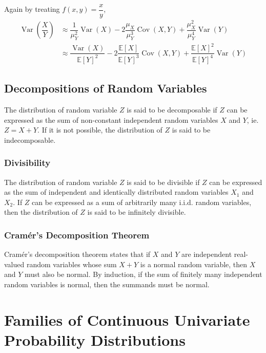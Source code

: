 \documentclass[11pt]{report} %
\begin{document}
Again by treating $f\left(x, y\right) = \dfrac{x}{y}$, 
\begin{align}
\operatorname{Var}\left(\dfrac{X}{Y}\right) &\approx \dfrac{1}{\mu_{Y}^{2}}\operatorname{Var}\left(X\right) - 2\dfrac{\mu_{X}}{\mu_{Y}^{3}}\operatorname{Cov}\left(X, Y\right) + \dfrac{\mu_{X}^{2}}{\mu_{Y}^{4}}\operatorname{Var}\left(Y\right) \\
&\approx \dfrac{\operatorname{Var}\left(X\right)}{\mathbb{E}\left[Y\right]^{2}} - 2\dfrac{\mathbb{E}\left[X\right]}{\mathbb{E}\left[Y\right]^{3}}\operatorname{Cov}\left(X, Y\right) + \dfrac{\mathbb{E}\left[X\right]^{2}}{\mathbb{E}\left[Y\right]^{4}}\operatorname{Var}\left(Y\right)
\end{align}

\subsection{Decompositions of Random Variables}

The distribution of random variable $Z$ is said to be decomposable if $Z$ can be expressed as the sum of non-constant independent random variables $X$ and $Y$, ie. $Z = X + Y$. If it is not possible, the distribution of $Z$ is said to be indecomposable.

\subsubsection{Divisibility}

The distribution of random variable $Z$ is said to be divisible if $Z$ can be expressed as the sum of independent and identically distributed random variables $X_{1}$ and $X_{2}$. If $Z$ can be expressed as a sum of arbitrarily many i.i.d. random variables, then the distribution of $Z$ is said to be infinitely divisible.

\subsubsection{Cram\'{e}r's Decomposition Theorem}

Cram\'{e}r's decomposition theorem states that if $X$ and $Y$ are independent real-valued random variables whose sum $X + Y$ is a normal random variable, then $X$ and $Y$ must also be normal. By induction, if the sum of finitely many independent random variables is normal, then the summands must be normal. 


\section{Families of Continuous Univariate Probability Distributions}
\end{document}
